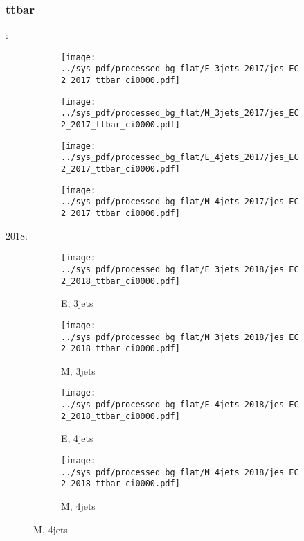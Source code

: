 \documentclass{beamer}
\begin{document}
\begin{frame}
\frametitle{ttbar}
\fontsize{5}{1}:
\begin{figure}
\centering
\begin{subfigure}[b]{0.24\textwidth}
\texttt{[image: ../sys\_pdf/processed\_bg\_flat/E\_3jets\_2017/jes\_EC2\_2017\_ttbar\_ci0000.pdf]}
\end{subfigure}
\begin{subfigure}[b]{0.24\textwidth}
\texttt{[image: ../sys\_pdf/processed\_bg\_flat/M\_3jets\_2017/jes\_EC2\_2017\_ttbar\_ci0000.pdf]}
\end{subfigure}
\begin{subfigure}[b]{0.24\textwidth}
\texttt{[image: ../sys\_pdf/processed\_bg\_flat/E\_4jets\_2017/jes\_EC2\_2017\_ttbar\_ci0000.pdf]}
\end{subfigure}
\begin{subfigure}[b]{0.24\textwidth}
\texttt{[image: ../sys\_pdf/processed\_bg\_flat/M\_4jets\_2017/jes\_EC2\_2017\_ttbar\_ci0000.pdf]}
\end{subfigure}
\end{figure}
2018:
\begin{figure}
\centering
\begin{subfigure}[b]{0.24\textwidth}
\texttt{[image: ../sys\_pdf/processed\_bg\_flat/E\_3jets\_2018/jes\_EC2\_2018\_ttbar\_ci0000.pdf]}
\captionsetup{font=tiny}
\caption{E, 3jets}
\end{subfigure}
\begin{subfigure}[b]{0.24\textwidth}
\texttt{[image: ../sys\_pdf/processed\_bg\_flat/M\_3jets\_2018/jes\_EC2\_2018\_ttbar\_ci0000.pdf]}
\captionsetup{font=tiny}
\caption{M, 3jets}
\end{subfigure}
\begin{subfigure}[b]{0.24\textwidth}
\texttt{[image: ../sys\_pdf/processed\_bg\_flat/E\_4jets\_2018/jes\_EC2\_2018\_ttbar\_ci0000.pdf]}
\captionsetup{font=tiny}
\caption{E, 4jets}
\end{subfigure}
\begin{subfigure}[b]{0.24\textwidth}
\texttt{[image: ../sys\_pdf/processed\_bg\_flat/M\_4jets\_2018/jes\_EC2\_2018\_ttbar\_ci0000.pdf]}
\captionsetup{font=tiny}
\caption{M, 4jets}
\end{subfigure}
\end{figure}
\end{frame}
\end{document}
